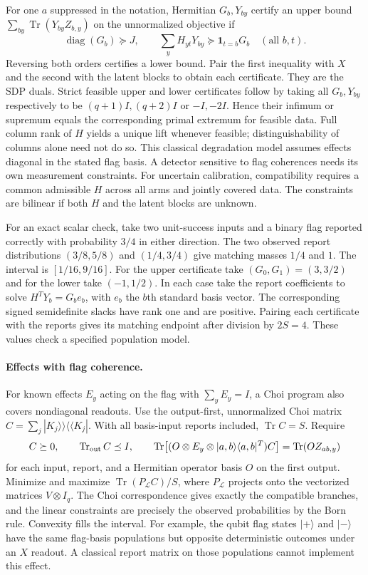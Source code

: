 \documentclass[11pt,letterpaper]{article}
\newcommand{\tr}{\operatorname{Tr}}\newcommand{\ket}[1]{\lvert#1\rangle}\newcommand{\proj}[1]{\ket{#1}\!\langle#1\rvert}
\begin{document}
For one $a$ suppressed in the notation, Hermitian $G_b,Y_{by}$ certify an upper bound $\sum_{by}\tr(Y_{by}Z_{b,y})$ on the unnormalized objective if
\[
 \operatorname{diag}(G_b)\succeq J,\qquad
 \sum_y H_{yt}Y_{by}\succeq\mathbf1_{t=b}G_b \quad(\text{all }b,t).
\]
Reversing both orders certifies a lower bound. Pair the first inequality with $X$ and the second with the latent blocks to obtain each certificate. They are the SDP duals. Strict feasible upper and lower certificates follow by taking all $G_b,Y_{by}$ respectively to be $(q+1)I,(q+2)I$ or $-I,-2I$. Hence their infimum or supremum equals the corresponding primal extremum for feasible data. Full column rank of $H$ yields a unique lift whenever feasible; distinguishability of columns alone need not do so. This classical degradation model assumes effects diagonal in the stated flag basis. A detector sensitive to flag coherences needs its own measurement constraints. For uncertain calibration, compatibility requires a common admissible $H$ across all arms and jointly covered data. The constraints are bilinear if both $H$ and the latent blocks are unknown.

For an exact scalar check, take two unit-success inputs and a binary flag reported correctly with probability $3/4$ in either direction. The two observed report distributions $(3/8,5/8)$ and $(1/4,3/4)$ give matching masses $1/4$ and $1$. The interval is $[1/16,9/16]$. For the upper certificate take $(G_0,G_1)=(3,3/2)$ and for the lower take $(-1,1/2)$. In each case take the report coefficients to solve $H^T Y_b=G_b e_b$, with $e_b$ the $b$th standard basis vector. The corresponding signed semidefinite slacks have rank one and are positive. Pairing each certificate with the reports gives its matching endpoint after division by $2S=4$. These values check a specified population model.

\paragraph{Effects with flag coherence.}
For known effects $E_y$ acting on the flag with $\sum_y E_y=I$, a Choi program also covers nondiagonal readouts. Use the output-first, unnormalized Choi matrix $C=\sum_j|K_j\rangle\!\rangle\langle\!\langle K_j|$. With all basis-input reports included, $\tr C=S$. Require
\[
 C\succeq0,\qquad \operatorname{Tr}_{\rm out}C\preceq I,\qquad
 \tr\!\left[(O\otimes E_y\otimes |a,b\rangle\langle a,b|^T)C\right]
   =\tr(O Z_{ab,y})
\]
for each input, report, and a Hermitian operator basis $O$ on the first output. Minimize and maximize $\tr(P_{\mathcal L}C)/S$, where $P_{\mathcal L}$ projects onto the vectorized matrices $V\otimes I_q$. The Choi correspondence gives exactly the compatible branches, and the linear constraints are precisely the observed probabilities by the Born rule. Convexity fills the interval. For example, the qubit flag states $|+\rangle$ and $|-\rangle$ have the same flag-basis populations but opposite deterministic outcomes under an $X$ readout. A classical report matrix on those populations cannot implement this effect.
\end{document}
